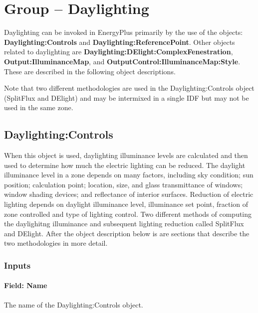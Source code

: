 \section{Group -- Daylighting}\label{group-daylighting}

Daylighting can be invoked in EnergyPlus primarily by the use of the objects: \textbf{Daylighting:Controls} and \textbf{Daylighting:ReferencePoint}. Other objects related to daylighting are \textbf{Daylighting:DElight:ComplexFenestration}, \textbf{Output:IlluminanceMap}, and \textbf{OutputControl:IlluminanceMap:Style}.  These are described in the following object descriptions.

\begin{callout}
  Note that two different methodologies are used in the Daylighting:Controls object (SplitFlux and DElight) and may be intermixed in a single IDF but may not be used in the same zone.
\end{callout}

\subsection{Daylighting:Controls}\label{daylightingcontrols-000}

When this object is used, daylighting illuminance levels are calculated and then used to determine how much the electric lighting can be reduced. The daylight illuminance level in a zone depends on many factors, including sky condition; sun position; calculation point; location, size, and glass transmittance of windows; window shading devices; and reflectance of interior surfaces. Reduction of electric lighting depends on daylight illuminance level, illuminance set point, fraction of zone controlled and type of lighting control. Two different methods of computing the daylighitng illuminance and subsequent lighting reduction called SplitFlux and DElight. After the object description below is are sections that describe the two methodologies in more detail.

\subsubsection{Inputs}\label{inputs-009}

\paragraph{Field: Name}\label{field-name-001}

The name of the Daylighting:Controls object.

